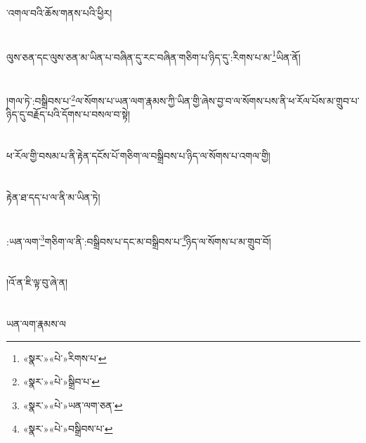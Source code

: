 ་འགལ་བའི་ཆོས་གནས་པའི་ཕྱིར།\chapter{ }ལུས་ཅན་དང་ལུས་ཅན་མ་ཡིན་པ་བཞིན་དུ་རང་བཞིན་གཅིག་པ་ཉིད་དུ་:རིགས་པ་མ་\footnote{«སྣར་»«པེ་»རིགས་པ་}ཡིན་ནོ།\chapter{ }།གལ་ཏེ་:བསྒྲིབས་པ་\footnote{«སྣར་»«པེ་»སྒྲིབ་པ་}ལ་སོགས་པ་ཡན་ལག་རྣམས་ཀྱི་ཡིན་གྱི་ཞེས་བྱ་བ་ལ་སོགས་པས་ནི་ཕ་རོལ་པོས་མ་གྲུབ་པ་ཉིད་དུ་བརྗོད་པའི་དོགས་པ་བསལ་བ་སྟེ།\chapter{ }ཕ་རོལ་གྱི་བསམ་པ་ནི་རྟེན་དངོས་པོ་གཅིག་ལ་བསྒྲིབས་པ་ཉིད་ལ་སོགས་པ་འགལ་གྱི།\chapter{ }རྟེན་ཐ་དད་པ་ལ་ནི་མ་ཡིན་ཏེ།\chapter{ }:ཡན་ལག་\footnote{«སྣར་»«པེ་»ཡན་ལག་ཅན་}གཅིག་ལ་ནི་:བསྒྲིབས་པ་དང་མ་བསྒྲིབས་པ་\footnote{«སྣར་»«པེ་»བསྒྲིབས་པ་}ཉིད་ལ་སོགས་པ་མ་གྲུབ་བོ།\chapter{ }།འོ་ན་ཇི་ལྟ་བུ་ཞེ་ན།\chapter{ }ཡན་ལག་རྣམས་ལ
